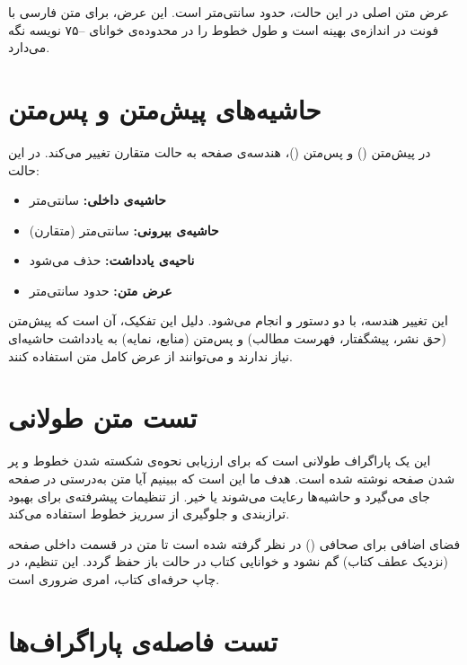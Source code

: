 \documentclass{matinbook}
\begin{document}
عرض متن اصلی در این حالت، حدود  سانتی‌متر است.
این عرض، برای متن فارسی با فونت  در اندازه‌ی
\pnum{۱۰pt} بهینه است و طول خطوط را در محدوده‌ی خوانای
--\pnum۷۵ نویسه نگه می‌دارد.

\section{حاشیه‌های پیش‌متن و پس‌متن}
\label{sec:geometry-frontmatter}

در پیش‌متن () و پس‌متن ()،
هندسه‌ی صفحه به حالت متقارن تغییر می‌کند. در این حالت:

\begin{itemize}
    \item \textbf{حاشیه‌ی داخلی:}  سانتی‌متر
    \item \textbf{حاشیه‌ی بیرونی:}  سانتی‌متر (متقارن)
    \item \textbf{ناحیه‌ی یادداشت:} حذف می‌شود
    \item \textbf{عرض متن:} حدود  سانتی‌متر
\end{itemize}

این تغییر هندسه، با دو دستور 
و  انجام می‌شود. دلیل
این تفکیک، آن است که پیش‌متن (حق نشر، پیشگفتار، فهرست مطالب)
و پس‌متن (منابع، نمایه) به یادداشت حاشیه‌ای نیاز ندارند و
می‌توانند از عرض کامل متن استفاده کنند.

\section{تست متن طولانی}
\label{sec:geometry-longtext}

این یک پاراگراف طولانی است که برای ارزیابی نحوه‌ی شکسته
شدن خطوط و پر شدن صفحه نوشته شده است. هدف ما این است که
ببینیم آیا متن به‌درستی در صفحه جای می‌گیرد و حاشیه‌ها
رعایت می‌شوند یا خیر.  از تنظیمات پیشرفته‌ی
 برای بهبود ترازبندی و جلوگیری از سرریز
خطوط استفاده می‌کند.

فضای اضافی برای صحافی () در نظر گرفته
شده است تا متن در قسمت داخلی صفحه (نزدیک عطف کتاب) گم
نشود و خوانایی کتاب در حالت باز حفظ گردد. این تنظیم،
در چاپ حرفه‌ای کتاب، امری ضروری است.

\section{تست فاصله‌ی پاراگراف‌ها}
\label{sec:geometry-paragraphs}
\end{document}
